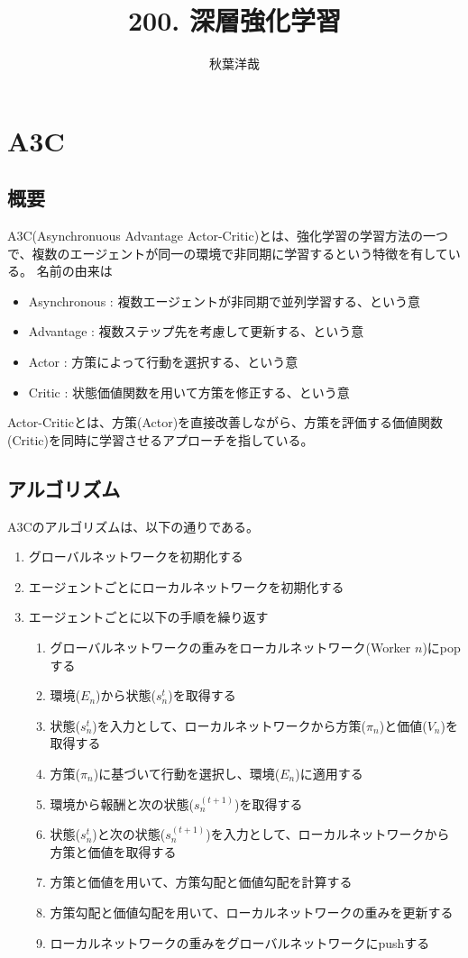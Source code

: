 \documentclass{ltjsarticle}
\begin{document}
\title{200. 深層強化学習}
\author{秋葉洋哉}
\maketitle

\section{A3C}
\subsection{概要}
A3C(Asynchronuous Advantage Actor-Critic)とは、強化学習の学習方法の一つで、複数のエージェントが同一の環境で非同期に学習するという特徴を有している。
名前の由来は
\begin{itemize}
  \item Asynchronous : 複数エージェントが非同期で並列学習する、という意
  \item Advantage : 複数ステップ先を考慮して更新する、という意
  \item Actor : 方策によって行動を選択する、という意
  \item Critic : 状態価値関数を用いて方策を修正する、という意
\end{itemize}
Actor-Criticとは、方策(Actor)を直接改善しながら、方策を評価する価値関数(Critic)を同時に学習させるアプローチを指している。

\subsection{アルゴリズム}
A3Cのアルゴリズムは、以下の通りである。
\begin{enumerate}
  \item グローバルネットワークを初期化する
  \item エージェントごとにローカルネットワークを初期化する
  \item エージェントごとに以下の手順を繰り返す
  \begin{enumerate}
    \item グローバルネットワークの重みをローカルネットワーク(Worker $n$)にpopする
    \item 環境($E_n$)から状態($s^t_n$)を取得する
    \item 状態($s^t_n$)を入力として、ローカルネットワークから方策($\pi_n$)と価値($V_n$)を取得する
    \item 方策($\pi_n$)に基づいて行動を選択し、環境($E_n$)に適用する
    \item 環境から報酬と次の状態($s^{(t+1)}_n$)を取得する
    \item 状態($s^t_n$)と次の状態($s^{(t+1)}_n$)を入力として、ローカルネットワークから方策と価値を取得する
    \item 方策と価値を用いて、方策勾配と価値勾配を計算する
    \item 方策勾配と価値勾配を用いて、ローカルネットワークの重みを更新する
    \item ローカルネットワークの重みをグローバルネットワークにpushする
  \end{enumerate}
\end{enumerate}
\end{document}
